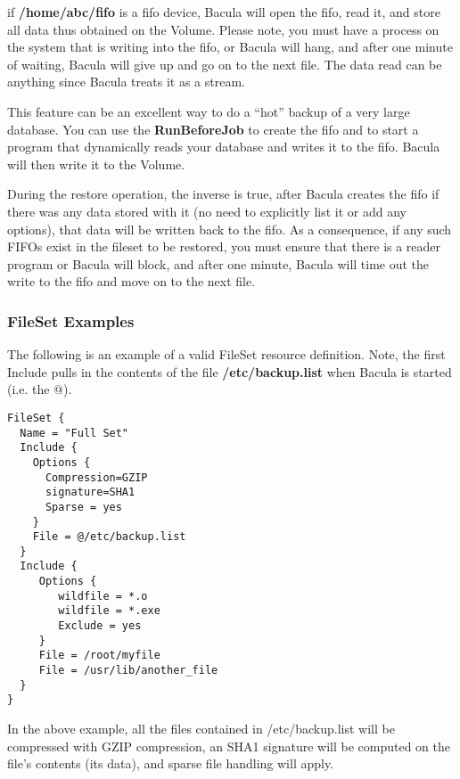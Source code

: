 \begin{itemize}
   if {\bf /home/abc/fifo} is a fifo device, Bacula will  open the fifo, read it,
   and store all data thus obtained  on the Volume. Please note, you must have a
   process on  the system that is writing into the fifo, or Bacula will  hang,
   and after one minute of waiting, Bacula will give up  and go on to the next
   file. The data read can be anything  since Bacula treats it as a stream.  

   This feature can be an excellent way to do a  ``hot'' backup of a very large
   database. You can  use the {\bf RunBeforeJob} to create the fifo and to  start
   a program that dynamically reads your database and  writes it to the fifo.
   Bacula will then write it to the  Volume.  

   During the restore operation, the inverse is true,  after Bacula creates the
   fifo if there was any data stored  with it (no need to explicitly list it or
   add any  options), that data will be written back to the fifo. As  a
   consequence, if any such FIFOs exist in the fileset to  be restored, you must
   ensure that there is a reader  program or Bacula will block, and after one
   minute, Bacula  will time out the write to the fifo and move on to the  next
   file. 
\end{itemize}

\subsubsection*{FileSet Examples}

The following is an example of a valid FileSet resource definition. Note, the
first Include pulls in the contents of the file {\bf /etc/backup.list} when
Bacula is started (i.e. the @). 

\footnotesize
\begin{verbatim}
FileSet {
  Name = "Full Set"
  Include {
    Options {
      Compression=GZIP
      signature=SHA1
      Sparse = yes
    }
    File = @/etc/backup.list
  }
  Include {
     Options {
        wildfile = *.o
        wildfile = *.exe
        Exclude = yes
     }
     File = /root/myfile
     File = /usr/lib/another_file
  }
}
\end{verbatim}
\normalsize

In the above example, all the files contained in /etc/backup.list will
be compressed with GZIP compression, an SHA1 signature will be computed on the
file's contents (its data), and sparse file handling will apply. 

